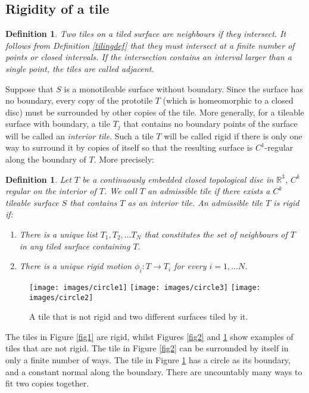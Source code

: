 \documentclass[11pt]{amsart}
\newcommand{\real}{\mathbb{R}}
\newtheorem{definition}[theorem]{Definition}
\theoremstyle{remark}
\begin{document}
\subsection{Rigidity of a tile}
\begin{definition} Two tiles on a tiled surface are \emph{neighbours} if they intersect.   
It follows from Definition \ref{tilingdef} that they must intersect at a finite number of points or closed intervals.
If the intersection contains an interval larger than a single point, the tiles 
are called \emph{adjacent}.
\end{definition}
Suppose that $S$ is a  monotileable surface without boundary.  
 Since the surface has no boundary, every copy of the prototile $T$ (which is homeomorphic to a closed disc) must be surrounded by other copies of the tile.   More generally, for a tileable surface with boundary, a tile $T_j$ that contains no boundary points of the surface will be called an \emph{interior tile}.  Such a tile $T$ will be called rigid if there is only one way  to surround it by copies of itself so that the resulting surface is $C^1$-regular along the boundary of $T$.  More precisely:
 \begin{definition}
 Let $T$ be a continuously embedded closed topological disc in $\real^3$,  $C^k$ regular on the interior of $T$.
 We call $T$ an \emph{admissible tile} if there exists a $C^k$ tileable surface $S$ that contains $T$ as an
 interior tile.  
 An admissible tile  $T$ is \emph{rigid} if:
 \begin{enumerate}
 \item There is a unique list $T_1, T_2, \dots T_N$ that constitutes the set of neighbours of $T$ in \emph{any}
 tiled surface containing $T$.
 \item There is a \emph{unique} rigid motion $\phi_i: T  \to T_i$ for every $i = 1, \dots N$.
\end{enumerate}
\end{definition}
 \begin{figure}[h!tbp]
	\begin{center}
	  \texttt{[image: images/circle1]}  \quad \quad
  \texttt{[image: images/circle3]}  	\quad \quad 
    \texttt{[image: images/circle2]}  												
		\end{center}
\caption{A tile that is not rigid and two different surfaces tiled by it.} \label{fig:nonrigid}
\end{figure} 

The tiles in Figure \ref{fig1} are rigid, whilst
Figures \ref{fig2} and \ref{fig:nonrigid} show examples of tiles that are not rigid.  
The tile in Figure \ref{fig2} can be surrounded by itself in only a finite number of ways.  The tile in Figure \ref{fig:nonrigid} has a circle as its boundary, and a constant normal along the boundary. There are uncountably many ways to fit two copies together.   
\end{document}
